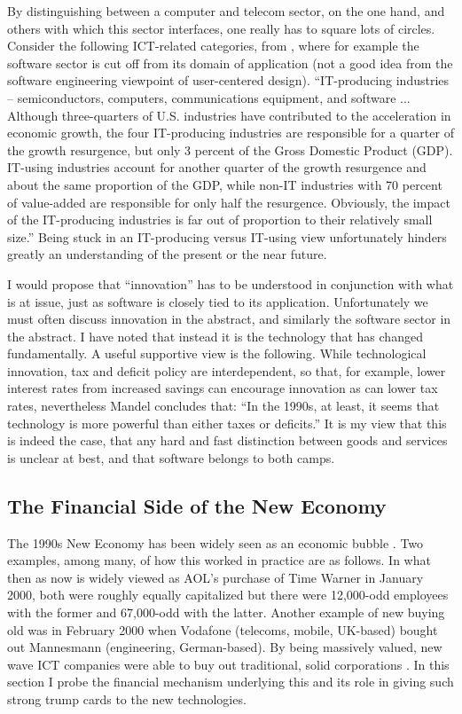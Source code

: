 \documentclass{article}
\begin{document}
By distinguishing between a computer and telecom sector, on the one hand,
and others with which this sector interfaces, one really has to 
square lots of circles.  Consider the following ICT-related
categories, from \cite{jorgensen},  where for example
the software sector is cut off from its domain of application
(not a good idea from the software engineering viewpoint of user-centered
design). 
``IT-producing industries -- semiconductors, computers, communications 
equipment, and software ...
Although three-quarters of U.S. industries have contributed to the
 acceleration in economic growth, the four IT-producing industries 
are responsible for a quarter of the growth resurgence, but only 
3 percent of the Gross Domestic Product (GDP). IT-using industries 
account for another quarter of the growth resurgence and about the 
same proportion of the GDP, while non-IT industries with 70 percent 
of value-added are responsible for only half the resurgence. Obviously, 
the impact of the IT-producing industries is far out of proportion to 
their relatively small size.''  Being stuck in an IT-producing versus IT-using view unfortunately
hinders greatly an understanding of the present or the near future.

I would propose that ``innovation'' has to be understood in 
conjunction with what is at issue,  
just as software is closely tied to its application.  
Unfortunately 
we must often 
discuss innovation in the abstract, and similarly the software sector in the 
abstract.  I have noted that 
instead it is the technology that has changed fundamentally.    
A useful supportive view is the following.  
While technological innovation, tax and deficit policy are interdependent, 
so that, for 
example, lower interest rates from increased savings can encourage 
innovation as can 
lower tax rates, nevertheless Mandel \cite{mandel} concludes that: 
``In the 1990s, at least, it seems 
that technology is more powerful than either taxes or deficits.''
It is my view that this is indeed the case, that any hard and fast
distinction between goods and services is unclear at best, and that 
software belongs to both camps.  

\subsection{The Financial Side of the New Economy}

The 1990s New Economy has been widely seen as an economic bubble
\cite{ghosh}.  
Two examples, among many, of how this worked in practice are as follows.
In what then as now is widely viewed as AOL's purchase of 
Time Warner in January 2000, both were 
roughly equally capitalized but there were 12,000-odd employees with the 
former and 67,000-odd with the latter.  
Another example of new buying old was in February 2000 when 
Vodafone (telecoms, mobile, UK-based)  bought out Mannesmann
(engineering, German-based).  By being massively valued, new wave ICT 
companies were able to buy out traditional, solid corporations
\cite{pennings}. 
In this section I probe the financial mechanism underlying this 
and its role 
in giving such strong trump cards to the new technologies.  
\end{document}
